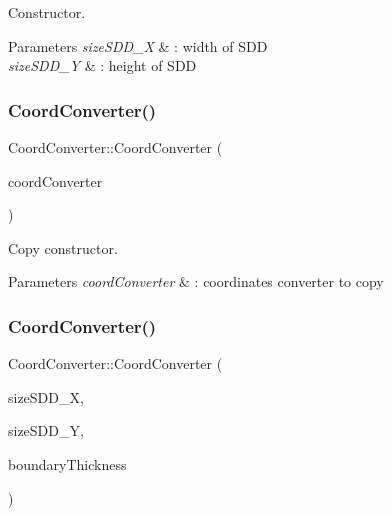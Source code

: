 Constructor. 


\begin{DoxyParams}{Parameters}
{\em size\+S\+D\+D\+\_\+X} & \+: width of S\+DD \\
\hline
{\em size\+S\+D\+D\+\_\+Y} & \+: height of S\+DD \\
\hline
\end{DoxyParams}
\mbox{\label{classCoordConverter_af11209a489a46dd335db0635d811999d}} 
\subsubsection{\texorpdfstring{Coord\+Converter()}{CoordConverter()}\hspace{0.1cm}{\footnotesize\ttfamily [2/4]}}
{\footnotesize\ttfamily Coord\+Converter\+::\+Coord\+Converter (\begin{DoxyParamCaption}\item[{const \hyperlink{classCoordConverter}{Coord\+Converter} \&}]{coord\+Converter }\end{DoxyParamCaption})}



Copy constructor. 


\begin{DoxyParams}{Parameters}
{\em coord\+Converter} & \+: coordinates converter to copy \\
\hline
\end{DoxyParams}
\mbox{\label{classCoordConverter_a0e773a3ee5461119d7ff285fde45427d}} 
\subsubsection{\texorpdfstring{Coord\+Converter()}{CoordConverter()}\hspace{0.1cm}{\footnotesize\ttfamily [3/4]}}
{\footnotesize\ttfamily Coord\+Converter\+::\+Coord\+Converter (\begin{DoxyParamCaption}\item[{unsigned int}]{size\+S\+D\+D\+\_\+X,  }\item[{unsigned int}]{size\+S\+D\+D\+\_\+Y,  }\item[{unsigned int}]{boundary\+Thickness }\end{DoxyParamCaption})}



